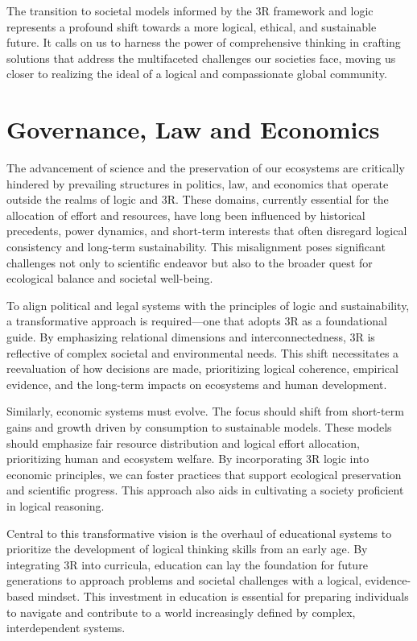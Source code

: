 \documentclass[12pt]{article}
\begin{document}
The transition to societal models informed by the 3R framework and \qbit{} logic represents a profound shift towards a more logical, ethical, and sustainable future. It calls on us to harness the power of comprehensive thinking in crafting solutions that address the multifaceted challenges our societies face, moving us closer to realizing the ideal of a logical and compassionate global community.

\section*{Governance, Law and Economics}

The advancement of science and the preservation of our ecosystems are critically hindered by prevailing structures in politics, law, and economics that operate outside the realms of logic and 3R. These domains, currently essential for the allocation of effort and resources, have long been influenced by historical precedents, power dynamics, and short-term interests that often disregard logical consistency and long-term sustainability. This misalignment poses significant challenges not only to scientific endeavor but also to the broader quest for ecological balance and societal well-being.

To align political and legal systems with the principles of logic and sustainability, a transformative approach is required—one that adopts 3R as a foundational guide. By emphasizing relational dimensions and interconnectedness, 3R is reflective of complex societal and environmental needs. This shift necessitates a reevaluation of how decisions are made, prioritizing logical coherence, empirical evidence, and the long-term impacts on ecosystems and human development.

Similarly, economic systems must evolve. The focus should shift from short-term gains and growth driven by consumption to sustainable models. These models should emphasize fair resource distribution and logical effort allocation, prioritizing human and ecosystem welfare. By incorporating 3R logic into economic principles, we can foster practices that support ecological preservation and scientific progress. This approach also aids in cultivating a society proficient in logical reasoning.


Central to this transformative vision is the overhaul of educational systems to prioritize the development of logical thinking skills from an early age. By integrating 3R into curricula, education can lay the foundation for future generations to approach problems and societal challenges with a logical, evidence-based mindset. This investment in education is essential for preparing individuals to navigate and contribute to a world increasingly defined by complex, interdependent systems.
\end{document}
